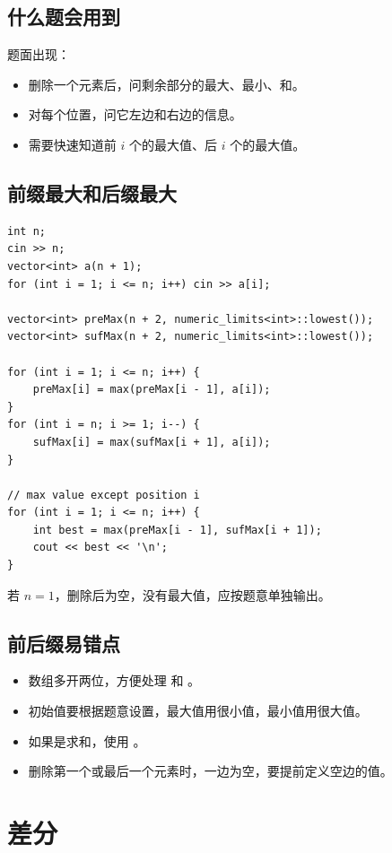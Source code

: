 \subsection{什么题会用到}

题面出现：

\begin{itemize}
  \item 删除一个元素后，问剩余部分的最大、最小、和。
  \item 对每个位置，问它左边和右边的信息。
  \item 需要快速知道前 $i$ 个的最大值、后 $i$ 个的最大值。
\end{itemize}

\subsection{前缀最大和后缀最大}

\begin{lstlisting}
int n;
cin >> n;
vector<int> a(n + 1);
for (int i = 1; i <= n; i++) cin >> a[i];

vector<int> preMax(n + 2, numeric_limits<int>::lowest());
vector<int> sufMax(n + 2, numeric_limits<int>::lowest());

for (int i = 1; i <= n; i++) {
    preMax[i] = max(preMax[i - 1], a[i]);
}
for (int i = n; i >= 1; i--) {
    sufMax[i] = max(sufMax[i + 1], a[i]);
}

// max value except position i
for (int i = 1; i <= n; i++) {
    int best = max(preMax[i - 1], sufMax[i + 1]);
    cout << best << '\n';
}
\end{lstlisting}

若 $n=1$，删除后为空，没有最大值，应按题意单独输出。

\subsection{前后缀易错点}

\begin{itemize}
  \item 数组多开两位，方便处理  和 。
  \item 初始值要根据题意设置，最大值用很小值，最小值用很大值。
  \item 如果是求和，使用 。
  \item 删除第一个或最后一个元素时，一边为空，要提前定义空边的值。
\end{itemize}

\section{差分}\label{sec:06-9}

